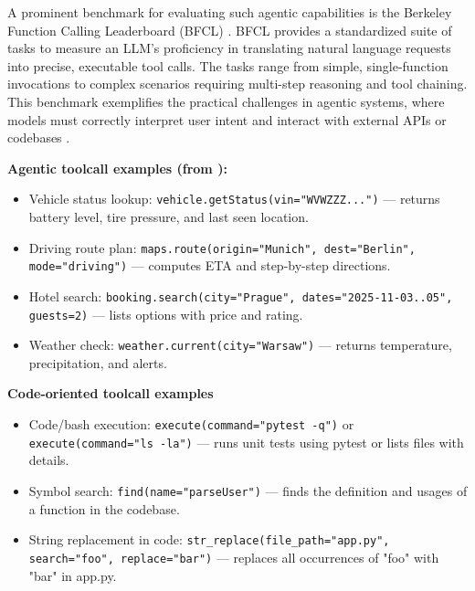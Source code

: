 A prominent benchmark for evaluating such agentic capabilities is the Berkeley Function Calling Leaderboard (BFCL) \cite{patil2025bfcl}. 
BFCL provides a standardized suite of tasks to measure an LLM's proficiency in translating natural language requests into precise, executable tool calls. 
The tasks range from simple, single-function invocations to complex scenarios requiring multi-step reasoning and tool chaining. 
This benchmark exemplifies the practical challenges in agentic systems, where models must correctly interpret user intent and interact with external APIs or codebases \cite{patil2025bfcl}.


\textbf{Agentic toolcall examples (from \cite{patil2025bfcl}):}
\begin{itemize}
  \item Vehicle status lookup: \texttt{vehicle.getStatus(vin="WVWZZZ...")} — returns battery level, tire pressure, and last seen location.
  \item Driving route plan: \texttt{maps.route(origin="Munich", dest="Berlin", mode="driving")} — computes ETA and step-by-step directions.
  \item Hotel search: \texttt{booking.search(city="Prague", dates="2025-11-03..05", guests=2)} — lists options with price and rating.
  \item Weather check: \texttt{weather.current(city="Warsaw")} — returns temperature, precipitation, and alerts.
\end{itemize}

\textbf{Code-oriented toolcall examples}
\begin{itemize}
  \item Code/bash execution: \texttt{execute(command="pytest -q")} or \texttt{execute(command="ls -la")} — runs unit tests using pytest or lists files with details.
  \item Symbol search: \texttt{find(name="parseUser")} — finds the definition and usages of a function in the codebase.
  \item String replacement in code: \texttt{str\_replace(file\_path="app.py", search="foo", replace="bar")} — replaces all occurrences of "foo" with "bar" in app.py.
\end{itemize}

